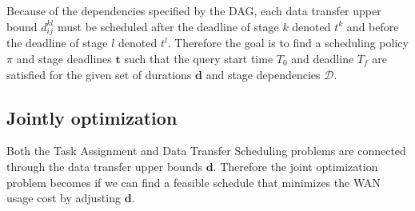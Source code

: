 Because of the dependencies specified by the DAG, each data transfer upper bound $d_{ij}^{kl}$ must be scheduled after the deadline of stage $k$ denoted $t^k$ and before the deadline of stage $l$ denoted $t^l$.
Therefore the goal is to find a scheduling policy $\pi$ and stage deadlines $\mathbf{t}$ such that the query start time $T_0$ and deadline $T_f$ are satisfied for the given set of durations $\mathbf{d}$ and stage dependencies $\mathcal{D}$.

\subsection{Jointly optimization}

Both the Task Assignment and Data Transfer Scheduling problems are connected through the data transfer upper bounds $\mathbf{d}$.
Therefore the joint optimization problem becomes if we can find a feasible schedule that minimizes the WAN usage cost by adjusting $\mathbf{d}$.